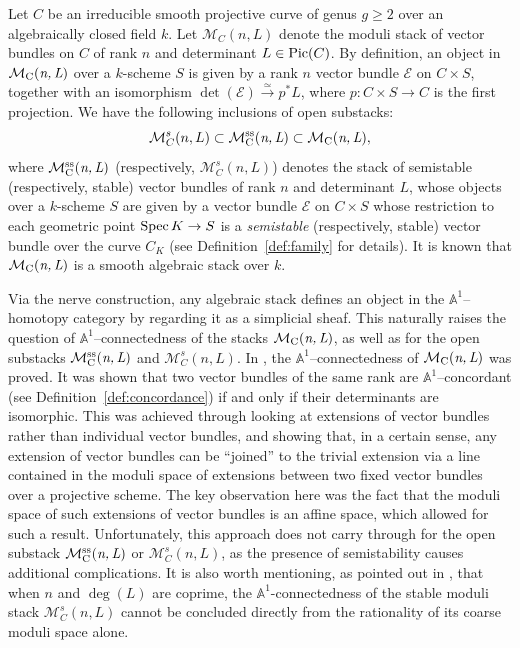 \documentclass[12pt,reqno]{amsart}
\DeclareMathOperator{\Pic}{\textnormal{Pic}}
\DeclareMathOperator{\mnl}{\mc{M}_C(\textit{n,\,L})}
\DeclareMathOperator{\mnlss}{\mc{M}^{ss}_C(\textit{n,\,L})}
\newcommand{\mc}[1]{\mathcal{#1}}
\newcommand{\bb}[1]{\mathbb{#1}}
\theoremstyle{definition}
\numberwithin{equation}{section}
\begin{document}
	Let $C$ be an irreducible smooth projective curve of genus $g\geq 2$ over
	an algebraically closed field $k$. Let $\mc{M}_C(n,L)$ denote the moduli
	stack of vector bundles on $C$ of rank $n$ and determinant $L\in \Pic(C)$.
	By definition, an object in $\mnl$ over a $k$-scheme $S$ is given by a rank
	$n$ vector bundle $\mc{E}$ on $C\times S$, together with an isomorphism
	$\det(\mc{E})\overset{\simeq}{\longrightarrow}p^*L$, where
	$p: C\times S \longrightarrow C$ is the first projection. We have the
	following inclusions of open substacks:
	\[
	\mc{M}^s_C(n,L)\subset \mnlss\subset\mnl,
	\]
	where $\mnlss$ (respectively, $\mc{M}^s_C(n,L)$) denotes the stack of
	semistable (respectively, stable) vector bundles of rank $n$ and determinant
	$L$, whose objects over a $k$-scheme $S$ are given by a vector bundle
	$\mc{E}$ on $C\times S$ whose restriction to each geometric point
	$\textnormal{Spec}\,K\rightarrow S$ is a \textit{semistable} (respectively,
	stable) vector bundle over the curve $C_K$ (see Definition~\ref{def:family}
	for details). It is known that $\mnl$ is a smooth algebraic stack over $k$.
	
	Via the nerve construction, any algebraic stack defines an object in the
	$\bb{A}^1$--homotopy category \cite{MV99} by regarding it as a simplicial
	sheaf. This naturally raises the question of $\bb{A}^1$--connectedness of
	the stacks $\mnl$, as well as for the open substacks $\mnlss$ and
	$\mc{M}_C^s(n,L)$. In \cite{HY24}, the $\bb{A}^1$--connectedness of $\mnl$
	was proved. It was shown that two vector bundles of the same rank are
	$\bb{A}^1$--concordant (see Definition~\ref{def:concordance}) if and only if
	their determinants are isomorphic. This was achieved through looking at
	extensions of vector bundles rather than individual vector bundles, and
	showing that, in a certain sense, any extension of vector bundles can be
	``joined'' to the trivial extension via a line contained in the moduli space
	of extensions between two fixed vector bundles over a projective scheme. The
	key observation here was the fact that the moduli space of such extensions of
	vector bundles is an affine space, which allowed for such a result.
	Unfortunately, this approach does not carry through for the open substack
	$\mnlss$ or $\mc{M}_C^s(n,L)$, as the presence of semistability causes
	additional complications. It is also worth mentioning, as pointed out in
	\cite[Example~2.9]{HY24}, that when $n$ and $\deg(L)$ are coprime, the
	$\bb{A}^1$-connectedness of the stable moduli stack $\mc{M}^{s}_C(n,L)$
	cannot be concluded directly from the rationality of its coarse moduli space
	alone.
	
\end{document}
